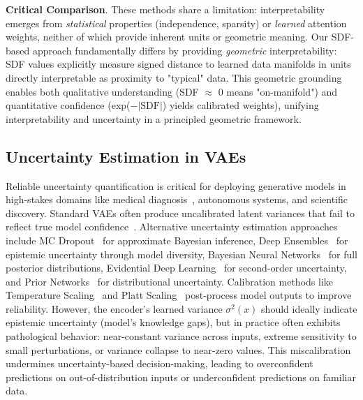 \documentclass[10pt,twocolumn,letterpaper]{article}
\begin{document}
\textbf{Critical Comparison}. These methods share a limitation: interpretability emerges from \textit{statistical} properties (independence, sparsity) or \textit{learned} attention weights, neither of which provide inherent units or geometric meaning. Our SDF-based approach fundamentally differs by providing \textit{geometric} interpretability: SDF values explicitly measure signed distance to learned data manifolds in units directly interpretable as proximity to "typical" data. This geometric grounding enables both qualitative understanding (SDF $\approx$ 0 means "on-manifold") and quantitative confidence (exp($-|\text{SDF}|$) yields calibrated weights), unifying interpretability and uncertainty in a principled geometric framework.

\subsection{Uncertainty Estimation in VAEs}

Reliable uncertainty quantification is critical for deploying generative models in high-stakes domains like medical diagnosis~\cite{leibig2017medical,uzunova2019medical}, autonomous systems, and scientific discovery. Standard VAEs often produce uncalibrated latent variances that fail to reflect true model confidence~\cite{uncertainty_latent2024}. Alternative uncertainty estimation approaches include MC Dropout~\cite{gal2016dropout} for approximate Bayesian inference, Deep Ensembles~\cite{lakshminarayanan2017ensembles} for epistemic uncertainty through model diversity, Bayesian Neural Networks~\cite{mackay1992bayesian} for full posterior distributions, Evidential Deep Learning~\cite{sensoy2018evidential} for second-order uncertainty, and Prior Networks~\cite{malinin2018prior} for distributional uncertainty. Calibration methods like Temperature Scaling~\cite{guo2017calibration} and Platt Scaling~\cite{platt1999platt} post-process model outputs to improve reliability. However, the encoder's learned variance $\sigma^2(x)$ should ideally indicate epistemic uncertainty (model's knowledge gaps), but in practice often exhibits pathological behavior: near-constant variance across inputs, extreme sensitivity to small perturbations, or variance collapse to near-zero values. This miscalibration undermines uncertainty-based decision-making, leading to overconfident predictions on out-of-distribution inputs or underconfident predictions on familiar data.
\end{document}
